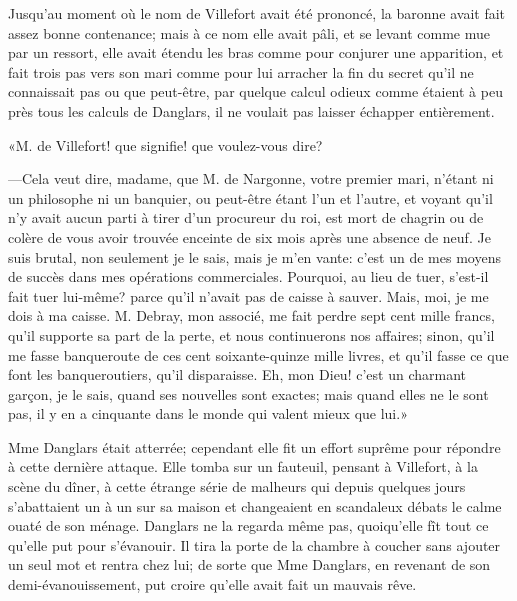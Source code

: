 Jusqu'au moment où le nom de Villefort avait été prononcé, la baronne avait fait assez bonne contenance; mais à ce nom elle avait pâli, et se levant comme mue par un ressort, elle avait étendu les bras comme pour conjurer une apparition, et fait trois pas vers son mari comme pour lui arracher la fin du secret qu'il ne connaissait pas ou que peut-être, par quelque calcul odieux comme étaient à peu près tous les calculs de Danglars, il ne voulait pas laisser échapper entièrement. 

«M. de Villefort! que signifie! que voulez-vous dire? 

—Cela veut dire, madame, que M. de Nargonne, votre premier mari, n'étant ni un philosophe ni un banquier, ou peut-être étant l'un et l'autre, et voyant qu'il n'y avait aucun parti à tirer d'un procureur du roi, est mort de chagrin ou de colère de vous avoir trouvée enceinte de six mois après une absence de neuf. Je suis brutal, non seulement je le sais, mais je m'en vante: c'est un de mes moyens de succès dans mes opérations commerciales. Pourquoi, au lieu de tuer, s'est-il fait tuer lui-même? parce qu'il n'avait pas de caisse à sauver. Mais, moi, je me dois à ma caisse. M. Debray, mon associé, me fait perdre sept cent mille francs, qu'il supporte sa part de la perte, et nous continuerons nos affaires; sinon, qu'il me fasse banqueroute de ces cent soixante-quinze mille livres, et qu'il fasse ce que font les banqueroutiers, qu'il disparaisse. Eh, mon Dieu! c'est un charmant garçon, je le sais, quand ses nouvelles sont exactes; mais quand elles ne le sont pas, il y en a cinquante dans le monde qui valent mieux que lui.» 

Mme Danglars était atterrée; cependant elle fit un effort suprême pour répondre à cette dernière attaque. Elle tomba sur un fauteuil, pensant à Villefort, à la scène du dîner, à cette étrange série de malheurs qui depuis quelques jours s'abattaient un à un sur sa maison et changeaient en scandaleux débats le calme ouaté de son ménage. Danglars ne la regarda même pas, quoiqu'elle fît tout ce qu'elle put pour s'évanouir. Il tira la porte de la chambre à coucher sans ajouter un seul mot et rentra chez lui; de sorte que Mme Danglars, en revenant de son demi-évanouissement, put croire qu'elle avait fait un mauvais rêve. 